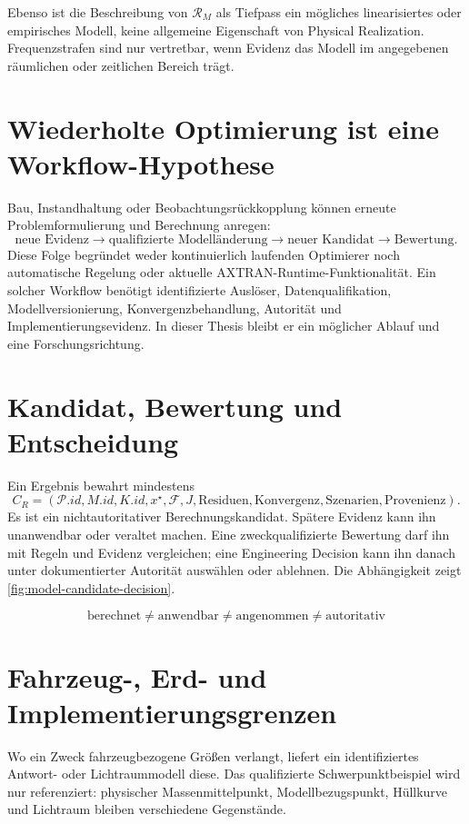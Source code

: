 Ebenso ist die Beschreibung von \(\mathcal R_M\) als Tiefpass ein mögliches
linearisiertes oder empirisches Modell, keine allgemeine Eigenschaft von
Physical Realization. Frequenzstrafen sind nur vertretbar, wenn Evidenz das
Modell im angegebenen räumlichen oder zeitlichen Bereich trägt.

\section{Wiederholte Optimierung ist eine Workflow-Hypothese}

Bau, Instandhaltung oder Beobachtungsrückkopplung können erneute
Problemformulierung und Berechnung anregen:
\[
\text{neue Evidenz}
\to\text{qualifizierte Modelländerung}
\to\text{neuer Kandidat}
\to\text{Bewertung}.
\]
Diese Folge begründet weder kontinuierlich laufenden Optimierer noch
automatische Regelung oder aktuelle AXTRAN-Runtime-Funktionalität. Ein solcher
Workflow benötigt identifizierte Auslöser, Datenqualifikation,
Modellversionierung, Konvergenzbehandlung, Autorität und
Implementierungsevidenz. In dieser Thesis bleibt er ein möglicher Ablauf und
eine Forschungsrichtung.

\section{Kandidat, Bewertung und Entscheidung}

Ein Ergebnis bewahrt mindestens
\[
C_R=
(\mathcal P.id,M.id,K.id,x^\star,\mathcal F,J,
\text{Residuen},\text{Konvergenz},\text{Szenarien},\text{Provenienz}).
\]
Es ist ein nichtautoritativer Berechnungskandidat. Spätere Evidenz kann ihn
unanwendbar oder veraltet machen. Eine zweckqualifizierte Bewertung darf ihn
mit Regeln und Evidenz vergleichen; eine Engineering Decision kann ihn danach
unter dokumentierter Autorität auswählen oder ablehnen. Die Abhängigkeit zeigt
\cref{fig:model-candidate-decision}.

\[
\boxed{\text{berechnet}
\neq\text{anwendbar}
\neq\text{angenommen}
\neq\text{autoritativ}}
\]

\section{Fahrzeug-, Erd- und Implementierungsgrenzen}

Wo ein Zweck fahrzeugbezogene Größen verlangt, liefert ein identifiziertes
Antwort- oder Lichtraummodell diese. Das qualifizierte Schwerpunktbeispiel wird
nur referenziert: physischer Massenmittelpunkt, Modellbezugspunkt, Hüllkurve
und Lichtraum bleiben verschiedene Gegenstände.

